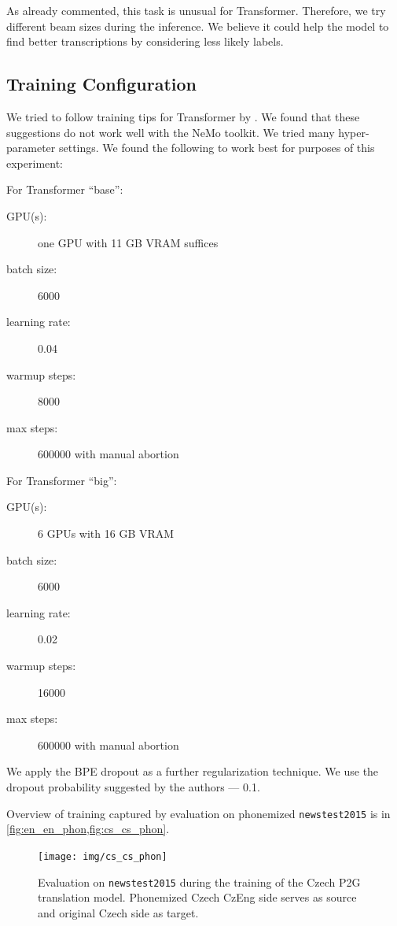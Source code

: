 As already commented, this task is unusual for Transformer. Therefore, we try different beam sizes during the inference. We believe it could help the model to find better transcriptions by considering less likely labels.

\subsection{Training Configuration}
\label{easr:training}
We tried to follow training tips for Transformer by . We found that these suggestions do not work well with the NeMo toolkit. We tried many hyper-parameter settings. We found the following to work best for purposes of this experiment:

For Transformer ``base'':
\begin{description}
	\item[GPU(s):] one GPU with 11 GB VRAM suffices
	\item[batch size:] 6000
	\item[learning rate:] 0.04
	\item[warmup steps:] 8000
	\item[max steps:] 600000 with manual abortion
\end{description}

For Transformer ``big'':
\begin{description}
	\item[GPU(s):] 6 GPUs with 16 GB VRAM
	\item[batch size:] 6000
	\item[learning rate:] 0.02
	\item[warmup steps:] 16000
	\item[max steps:] 600000 with manual abortion
\end{description}

We apply the BPE dropout  as a further regularization technique. We use the dropout probability suggested by the authors --- 0.1.

Overview of training captured by evaluation on phonemized \texttt{newstest2015} is in \cref{fig:en_en_phon,fig:cs_cs_phon}.

\begin{figure}[h]
	\texttt{[image: img/cs\_cs\_phon]}
	\caption{Evaluation on \texttt{newstest2015} during the training of the Czech P2G translation model. Phonemized Czech CzEng side serves as source and original Czech side as target.}
	\label{fig:cs_cs_phon}
\end{figure}



